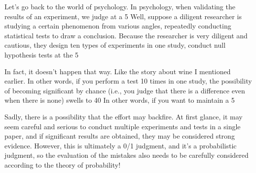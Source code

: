 \documentclass{ltjsbook}
\begin{document}
Let's go back to the world of psychology. In psychology, when validating the results of an experiment, we judge at a 5%
Well, suppose a diligent researcher is studying a certain phenomenon from various angles, repeatedly conducting statistical tests to draw a conclusion. Because the researcher is very diligent and cautious, they design ten types of experiments in one study, conduct null hypothesis tests at the 5%

In fact, it doesn't happen that way. Like the story about wine I mentioned earlier. In other words, if you perform a test 10 times in one study, the possibility of becoming significant by chance (i.e., you judge that there is a difference even when there is none) swells to 40%
In other words, if you want to maintain a 5%

Sadly, there is a possibility that the effort may backfire. At first glance, it may seem careful and serious to conduct multiple experiments and tests in a single paper, and if significant results are obtained, they may be considered strong evidence. However, this is ultimately a 0/1 judgment, and it's a probabilistic judgment, so the evaluation of the mistakes also needs to be carefully considered according to the theory of probability!
\end{document}
